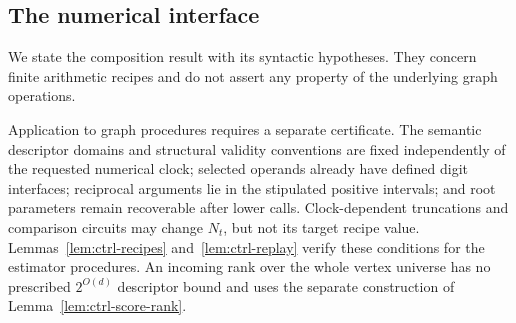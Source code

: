 \subsection{The numerical interface}


We state the composition result with its syntactic hypotheses.
They concern finite arithmetic recipes and do not assert any
property of the underlying graph operations.

Application to graph procedures requires a separate certificate.  The
semantic descriptor domains and structural validity conventions are
fixed independently of the requested numerical clock; selected operands
already have defined digit interfaces; reciprocal arguments lie in the
stipulated positive intervals; and root parameters remain recoverable
after lower calls.  Clock-dependent truncations and comparison circuits
may change $N_t$, but not its target recipe value.
Lemmas~\ref{lem:ctrl-recipes} and~\ref{lem:ctrl-replay} verify these
conditions for the estimator procedures.  An incoming rank over the
whole vertex universe has no prescribed $2^{O(d)}$ descriptor bound and
uses the separate construction of Lemma~\ref{lem:ctrl-score-rank}.

